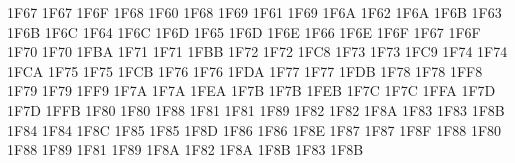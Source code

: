\setcclcucx 1F67 1F67 1F6F %
\setcclcucx 1F68 1F60 1F68 %
\setcclcucx 1F69 1F61 1F69 %
\setcclcucx 1F6A 1F62 1F6A %
\setcclcucx 1F6B 1F63 1F6B %
\setcclcucx 1F6C 1F64 1F6C %
\setcclcucx 1F6D 1F65 1F6D %
\setcclcucx 1F6E 1F66 1F6E %
\setcclcucx 1F6F 1F67 1F6F %
\setcclcucx 1F70 1F70 1FBA %
\setcclcucx 1F71 1F71 1FBB %
\setcclcucx 1F72 1F72 1FC8 %
\setcclcucx 1F73 1F73 1FC9 %
\setcclcucx 1F74 1F74 1FCA %
\setcclcucx 1F75 1F75 1FCB %
\setcclcucx 1F76 1F76 1FDA %
\setcclcucx 1F77 1F77 1FDB %
\setcclcucx 1F78 1F78 1FF8 %
\setcclcucx 1F79 1F79 1FF9 %
\setcclcucx 1F7A 1F7A 1FEA %
\setcclcucx 1F7B 1F7B 1FEB %
\setcclcucx 1F7C 1F7C 1FFA %
\setcclcucx 1F7D 1F7D 1FFB %
\setcclcucx 1F80 1F80 1F88 %
\setcclcucx 1F81 1F81 1F89 %
\setcclcucx 1F82 1F82 1F8A %
\setcclcucx 1F83 1F83 1F8B %
\setcclcucx 1F84 1F84 1F8C %
\setcclcucx 1F85 1F85 1F8D %
\setcclcucx 1F86 1F86 1F8E %
\setcclcucx 1F87 1F87 1F8F %
\setcclcucx 1F88 1F80 1F88 %
\setcclcucx 1F89 1F81 1F89 %
\setcclcucx 1F8A 1F82 1F8A %
\setcclcucx 1F8B 1F83 1F8B %
